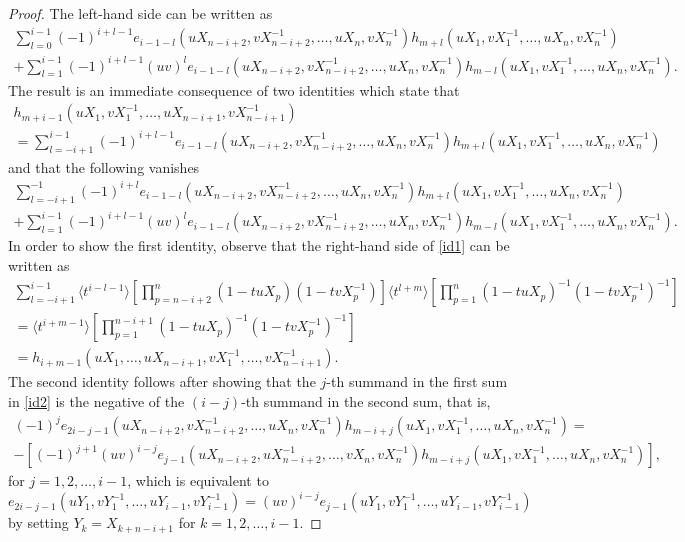 \documentclass[12pt]{amsart}
\theoremstyle{definition}
\numberwithin{equation}{section}
\begin{document}
\begin{proof} The left-hand side can be written as 
	\begin{multline*} 
		\sum_{l=0}^{i-1} (-1)^{i+l-1} e_{i-1-l}(u X_{n-i+2},v X_{n-i+2}^{-1},\ldots,u X_n,v X_n^{-1}) h_{m+l}(u X_1,v X_1^{-1},\ldots,u X_n,v X_n^{-1}) \\
		+ \sum_{l=1}^{i-1} (-1)^{i+l-1} (u v)^{l} e_{i-1-l}(u X_{n-i+2},v X_{n-i+2}^{-1},\ldots,u X_n,v X_n^{-1})  h_{m-l}(u X_1,v X_1^{-1},\ldots,u X_n,v X_n^{-1}). 
	\end{multline*} 
	The result is an immediate consequence of two identities which state that
	\begin{multline} 
		\label{id1}
		h_{m+i-1}(u X_1,v X_1^{-1},\ldots,u X_{n-i+1},v X_{n-i+1}^{-1})\\
		= \sum_{l=-i+1}^{i-1} (-1)^{i+l-1} e_{i-1-l}(u X_{n-i+2},v X_{n-i+2}^{-1},\ldots,u X_n,v X_n^{-1}) h_{m+l}(u X_1,v X_1^{-1},\ldots,u X_n,v X_n^{-1})
	\end{multline}
	and that the following vanishes
	\begin{multline}
		\label{id2}
		\sum_{l=-i+1}^{-1} (-1)^{i+l} e_{i-1-l}(u X_{n-i+2},v X_{n-i+2}^{-1},\ldots,u X_n,v X_n^{-1}) h_{m+l}(u X_1,v X_1^{-1},\ldots,u X_n,v X_n^{-1}) \\
		+ \sum_{l=1}^{i-1} (-1)^{i+l-1} (u v)^{l} e_{i-1-l}(u X_{n-i+2},v X_{n-i+2}^{-1},\ldots,u X_n,v X_n^{-1})  h_{m-l}(u X_1,v X_1^{-1},\ldots,u X_n,v X_n^{-1}).
	\end{multline}
	In order to show the first identity, observe that the right-hand side of \eqref{id1} can be written as 
	\begin{multline*} 
		\sum_{l=-i+1}^{i-1} \langle t^{i-l-1} \rangle \left[ 
		\prod_{p=n-i+2}^n (1-t u X_p)(1-t v X_p^{-1}) \right]  
		\langle t^{l+m} \rangle \left[ \prod_{p=1}^n (1-t u X_p)^{-1}(1-t v X_p^{-1})^{-1} \right] \\
		= \langle t^{i+m-1} \rangle \left[ \prod_{p=1}^{n-i+1} (1-t u X_p)^{-1}(1-t vX_p^{-1})^{-1} \right] \\ = h_{i+m-1}(u X_1,\ldots,u X_{n-i+1},v X_1^{-1},\ldots,v X_{n-i+1}^{-1}).
	\end{multline*} 
	The second identity follows after showing that the $j$-th summand in the first sum in 
	\eqref{id2} is the negative of the $(i-j)$-th summand  in the second sum, that is,
	\begin{multline*}
		(-1)^{j} e_{2i-j-1}(u X_{n-i+2},v X_{n-i+2}^{-1},\ldots,u X_n,v X_n^{-1}) h_{m-i+j}(u X_1,v X_1^{-1},\ldots,u X_n,v X_n^{-1})= \\
		-[(-1)^{j+1} (u v)^{i-j} e_{j-1}(u X_{n-i+2},u X_{n-i+2}^{-1},\ldots,v X_n,v X_n^{-1})  h_{m-i+j}(u X_1,v X_1^{-1},\ldots,u X_n,v X_n^{-1})], 
	\end{multline*} 
	for $j=1,2,\ldots,i-1$, which is equivalent to 
	\begin{equation*}
	e_{2i-j-1}(u Y_1,v Y_1^{-1},\ldots,u Y_{i-1},v Y_{i-1}^{-1}) 
	= (u v)^{i-j} e_{j-1}(u Y_1,v Y_1^{-1},\ldots,u Y_{i-1},v Y_{i-1}^{-1})
	\end{equation*} 
	by setting $Y_k=X_{k+n-i+1}$ for $k=1,2,\dots,i-1$.
	

\end{proof}
\end{document}
